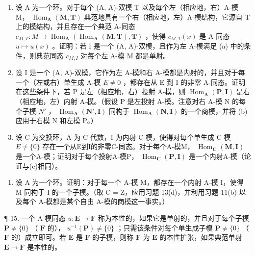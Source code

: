 \begin{enumerate}
\def\labelenumi{(\alph{enumi})}
\setcounter{enumi}{1}
\item
  设 A 为一个环。对于每个 (A, A)-双模 T 以及每个左（相应地，右）A-模 M， \(\operatorname{Hom}_{\mathbf{A}}(\mathbf{M}, \mathbf{T})\) 典范地具有一个右（相应地，左）A-模结构，它源自 T 上的模结构，并且存在一个典范 A-同态 \(c_{M,T}: M \to \operatorname{Hom}_{\mathbf{A}}(\operatorname{Hom}_{\mathbf{A}}(\mathbf{M}, \mathbf{T}), \mathbf{T})\) ，使得 \(c_{M,T}(x)\) 是 A-同态 \(u \mapsto u(x)\) 。证明：若 I 是一个 (A, A)-双模，且作为左 A-模满足 (a) 中的条件，则典范同态 \(c_{M,I}\) 对每个左 A-模 M 都是单射。
\item
  设 I 是一个 (A, A)-双模，它作为左 A-模和右 A-模都是内射的，并且对于每一个（左或右）单生成 A-模 \(E \neq 0\) ，都存在从 E 到 I 的非零 A-同态。证明在这些条件下，若 P 是左（相应地，右）投射 A-模，则 \(\operatorname{Hom}_{\mathbf{A}}(\mathbf{P}, \mathbf{I})\) 是右（相应地，左）内射 A-模。（假设 P 是左投射 A-模。注意对右 A-模 N 的每个子模 \(N'\) ， \(\operatorname{Hom}_{\mathbf{A}}(\mathbf{N}', \mathbf{I})\) 同构于 \(\operatorname{Hom}_{\mathbf{A}}(\mathbf{N}, \mathbf{I})\) 的一个商模，并将 (b) 应用于右模 N 和左模 P。）
\item
  设 C 为交换环，A 为 C-代数，I 为内射 C-模，使得对每个单生成 C-模 \(E \neq \{0\}\) 存在一个从E到I的非零C-同态。对于每个A-模M， \(\operatorname{Hom}_{\mathbf{C}}(\mathbf{M}, \mathbf{I})\) 是一个A-模；证明对于每个投射A-模P， \(\operatorname{Hom}_{\mathbf{C}}(\mathbf{P}, \mathbf{I})\) 是一个内射A-模（论证与(c)相同）。
\end{enumerate}

\begin{enumerate}
\def\labelenumi{\arabic{enumi}.}
\setcounter{enumi}{13}
\tightlist
\item
  设 A 为一个环。证明：对于每一个 A-模 M，都存在一个内射 A-模 I，使得 M 同构于 I 的一个子模。（取 C = Z，应用习题 13(d)，并利用习题 11(b) 以及每个 A-模都是某个自由 A-模的商模这一事实。）
\end{enumerate}

¶ 15. 一个 A-模同态 \(u: \mathbf{E} \to \mathbf{F}\) 称为本性的，如果它是单射的，并且对于每个子模 \(\mathbf{P} \neq \{0\}\) （ \(\mathbf{F}\) 的）， \(u^{-1}(\mathbf{P}) \neq \{0\}\) ；只需该条件对每个单生成子模 \(\mathbf{P} \neq \{0\}\) （ \(\mathbf{F}\) 的）成立即可。若 \(\mathbf{E}\) 是 \(\mathbf{F}\) 的子模，则称 \(\mathbf{F}\) 为 \(\mathbf{E}\) 的本性扩张，如果典范单射 \(\mathbf{E} \to \mathbf{F}\) 是本性的。


